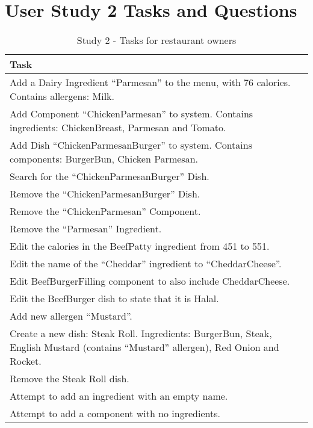\chapter{User Study 2 Tasks and Questions}
\label{app:study2}


\begin{table}[h]
    \centering
    \begin{tabular}{ |p{\textwidth}| }
    \hline
    \textbf{Task}\\
    \hline
    Add a Dairy Ingredient ``Parmesan'' to the menu, with 76 calories. Contains allergens: Milk. \\
    \hline
    Add Component ``ChickenParmesan'' to system. Contains ingredients: ChickenBreast, Parmesan and Tomato. \\
    \hline
    Add Dish ``ChickenParmesanBurger'' to system. Contains components: BurgerBun, Chicken Parmesan. \\
    \hline
    Search for the ``ChickenParmesanBurger'' Dish. \\
    \hline
    Remove the ``ChickenParmesanBurger'' Dish. \\
    \hline
    Remove the ``ChickenParmesan'' Component. \\
    \hline
    Remove the ``Parmesan'' Ingredient. \\
    \hline
    Edit the calories in the BeefPatty ingredient from 451 to 551. \\
    \hline
    Edit the name of the ``Cheddar'' ingredient to ``CheddarCheese''. \\
    \hline
    Edit BeefBurgerFilling component to also include CheddarCheese. \\
    \hline
    Edit the BeefBurger dish to state that it is Halal. \\
    \hline
    Add new allergen ``Mustard''. \\
    \hline
    Create a new dish: Steak Roll. Ingredients: BurgerBun, Steak, English Mustard (contains ``Mustard'' allergen), Red Onion and Rocket. \\
    \hline
    Remove the Steak Roll dish. \\
    \hline
    Attempt to add an ingredient with an empty name. \\
    \hline
    Attempt to add a component with no ingredients. \\
    \hline
    \end{tabular}
    \caption{Study 2 - Tasks for restaurant owners}
    \label{tab:Study2TasksRO}
\end{table}


